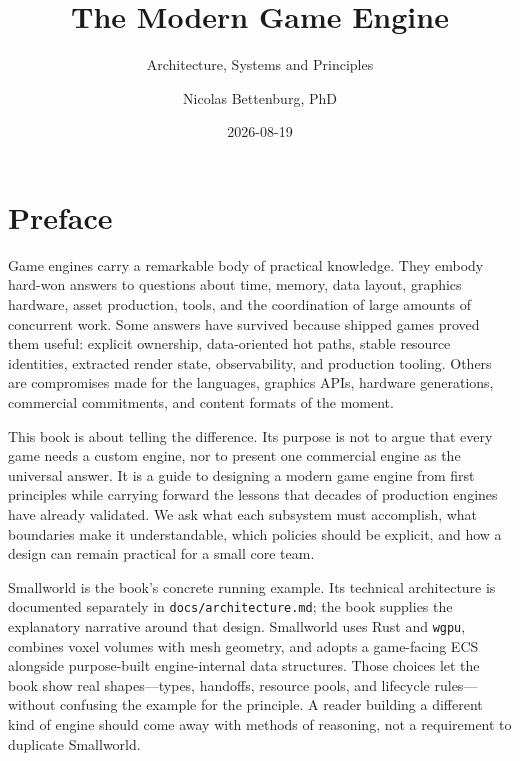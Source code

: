 \documentclass[
  11pt,
  letterpaper,
  DIV=11,
  numbers=noendperiod,
  twoside,
  open=right]{scrreprt}
\title{The Modern Game Engine}
\subtitle{Architecture, Systems and Principles}
\author{Nicolas Bettenburg, PhD}
\date{2026-08-19}
\renewcommand{\maketitle}{%
}
\renewcommand*\contentsname{Table of contents}
\newcommand\contentsname{Table of contents}
\begin{document}
\maketitle

\renewcommand*\contentsname{Table of contents}
{
\setcounter{tocdepth}{2}
\tableofcontents
}


\chapter*{Preface}\label{preface}


Game engines carry a remarkable body of practical knowledge. They embody
hard-won answers to questions about time, memory, data layout, graphics
hardware, asset production, tools, and the coordination of large amounts
of concurrent work. Some answers have survived because shipped games
proved them useful: explicit ownership, data-oriented hot paths, stable
resource identities, extracted render state, observability, and
production tooling. Others are compromises made for the languages,
graphics APIs, hardware generations, commercial commitments, and content
formats of the moment.

This book is about telling the difference. Its purpose is not to argue
that every game needs a custom engine, nor to present one commercial
engine as the universal answer. It is a guide to designing a modern game
engine from first principles while carrying forward the lessons that
decades of production engines have already validated. We ask what each
subsystem must accomplish, what boundaries make it understandable, which
policies should be explicit, and how a design can remain practical for a
small core team.

Smallworld is the book's concrete running example. Its technical
architecture is documented separately in \texttt{docs/architecture.md};
the book supplies the explanatory narrative around that design.
Smallworld uses Rust and \texttt{wgpu}, combines voxel volumes with mesh
geometry, and adopts a game-facing ECS alongside purpose-built
engine-internal data structures. Those choices let the book show real
shapes---types, handoffs, resource pools, and lifecycle rules---without
confusing the example for the principle. A reader building a different
kind of engine should come away with methods of reasoning, not a
requirement to duplicate Smallworld.
\end{document}
